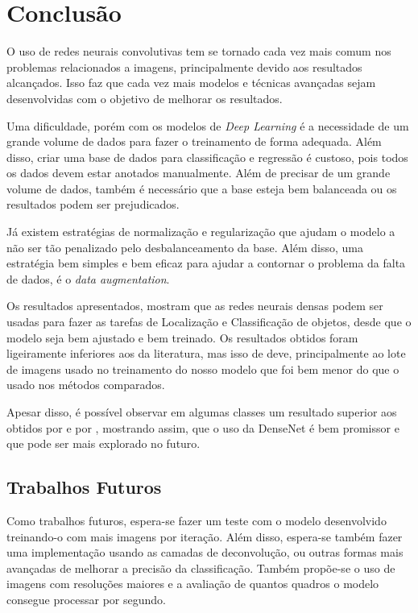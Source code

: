 \chapter{Conclusão}
\label{cap:6}

O uso de redes neurais convolutivas tem se tornado cada vez mais comum nos problemas relacionados a imagens, principalmente devido aos resultados alcançados. Isso faz que cada vez mais modelos e técnicas avançadas sejam desenvolvidas com o objetivo de melhorar os resultados.

Uma dificuldade, porém com os modelos de \textit{Deep Learning} é a necessidade de um grande volume de dados para fazer o treinamento de forma adequada. Além disso, criar uma base de dados para classificação e regressão é custoso, pois todos os dados devem estar anotados manualmente. Além de precisar de um grande volume de dados, também é necessário que a base esteja bem balanceada ou os resultados podem ser prejudicados.

Já existem estratégias de normalização e regularização que ajudam o modelo a não ser tão penalizado pelo desbalanceamento da base. Além disso, uma estratégia bem simples e bem eficaz para ajudar a contornar o problema da falta de dados, é o \textit{data augmentation}.

Os resultados apresentados, mostram que as redes neurais densas podem ser usadas para fazer as tarefas de Localização e Classificação de objetos, desde que o modelo seja bem ajustado e bem treinado. Os resultados obtidos foram ligeiramente inferiores aos da literatura, mas isso de deve, principalmente ao lote de imagens usado no treinamento do nosso modelo que foi bem menor do que o usado nos métodos comparados.

Apesar disso, é possível observar em algumas classes um resultado superior aos obtidos por  e por , mostrando assim, que o uso da \ac{DenseNet} é bem promissor e que pode ser mais explorado no futuro.

\section{Trabalhos Futuros}

Como trabalhos futuros, espera-se fazer um teste com o modelo desenvolvido treinando-o com mais imagens por iteração. Além disso, espera-se também fazer uma implementação usando as camadas de deconvolução, ou outras formas mais avançadas de melhorar a precisão da classificação. Também propõe-se o uso de imagens com resoluções maiores e a avaliação de quantos quadros o modelo consegue processar por segundo.